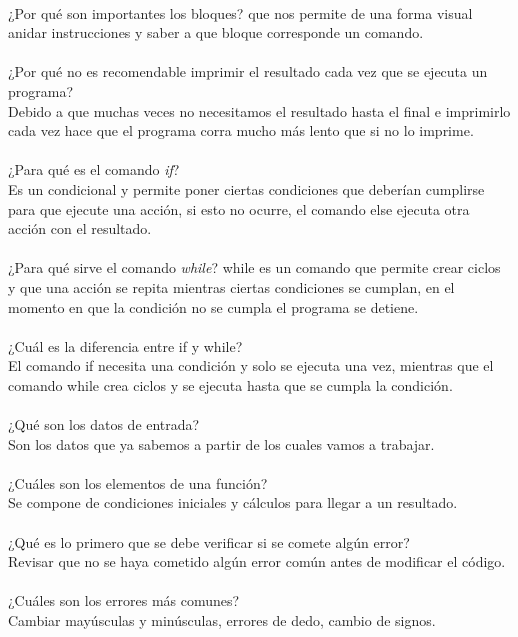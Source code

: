 \documentclass{book}
\begin{document}
	\\
	¿Por qué son importantes los bloques?
	que nos permite de una forma visual anidar instrucciones y saber a que bloque corresponde un comando.\\
	\\
	¿Por qué no es recomendable imprimir el resultado cada vez que se ejecuta un programa?\\
	Debido a que muchas veces no necesitamos el resultado hasta el final e imprimirlo cada vez hace que el programa corra mucho más lento que si no lo imprime.\\
	\\
	¿Para qué es el comando \textit{if}?\\
	Es un condicional y permite poner ciertas condiciones que deberían cumplirse para que ejecute una acción, si esto no ocurre, el comando else ejecuta otra acción con el resultado.\\
	\\
	¿Para qué sirve el comando \textit{while}?
	while es un comando que permite crear ciclos y que una acción se repita mientras ciertas condiciones se cumplan, en el momento en que la condición no se cumpla el programa se detiene.\\
	\\
	¿Cuál es la diferencia entre if y while?\\
	El comando if necesita una condición y solo se ejecuta una vez, mientras que el comando while crea ciclos y se ejecuta hasta que se cumpla la condición.\\
	\\
	¿Qué son los datos de entrada?\\
	Son los datos que ya sabemos a partir de los cuales vamos a trabajar.\\
	\\
	¿Cuáles son los elementos de una función?\\
	Se compone de condiciones iniciales y cálculos para llegar a un resultado.\\
	\\
	¿Qué es lo primero que se debe verificar si se comete algún error?\\
	Revisar que no se haya cometido algún error común antes de modificar el código.\\
	\\
	¿Cuáles son los errores más comunes?\\
	Cambiar mayúsculas y minúsculas, errores de dedo, cambio de signos.\\
	\\
\end{document}
